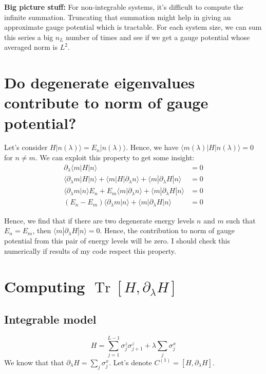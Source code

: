 \documentclass[11pt,a4paper]{article}
\DeclareMathOperator{\Tr}{Tr}
\begin{document}
\textbf{Big picture stuff:} For non-integrable systems, it's difficult to compute the infinite summation. Truncating that summation might help in giving an approximate gauge potential which is tractable. For each system size, we can sum this series a big $n_L$ number of times and see if we get a gauge potential whose averaged norm is $L^2$.


\appendix
\section{Do degenerate eigenvalues contribute to norm of gauge potential?}\label{sec.deg}
Let's consider $H | n(\lambda) \rangle= E_n  | n(\lambda) \rangle $. Hence, we have $\langle m(\lambda)  |  H | n(\lambda) \rangle=0$ for $n\neq m$. We can exploit this property to get some insight:
\begin{align*}
\partial_{\lambda}\langle m  |  H | n\rangle&=0\\
\langle \partial_{\lambda} m |  H | n \rangle + \langle  m  |  H |\partial_{\lambda} n \rangle + \langle  m  | \partial_{\lambda} H | n \rangle&=0\\
\langle \partial_{\lambda} m   | n \rangle E_n + E_m\langle  m  |   \partial_{\lambda} n \rangle + \langle  m  | \partial_{\lambda} H | n \rangle&=0\\
(E_n - E_m)\langle  \partial_{\lambda} m  |    n \rangle + \langle  m  | \partial_{\lambda} H | n \rangle&=0
\end{align*}

Hence, we find that if there are two degenerate energy levels $n$ and $m$ such that $E_n=E_m$, then $\langle  m  | \partial_{\lambda} H | n \rangle=0$. Hence, the contribution to norm of gauge potential from this pair of energy levels will be zero. I should check this numerically if results of my code respect this property.


\section{Computing $\Tr [H, \partial_{\lambda}H] $}
\subsection{Integrable model}
\begin{equation}
H=  \sum_{j=1}^{L-1} \sigma_j^z \sigma_{j+1}^z + \lambda \sum_{j} \sigma_j^x
\end{equation}
We know that that $\partial_{\lambda}H =  \sum_{j} \sigma_j^x $. Let's denote  $C^{(1)}=[H,\partial_{\lambda}H]$. 
\end{document}
